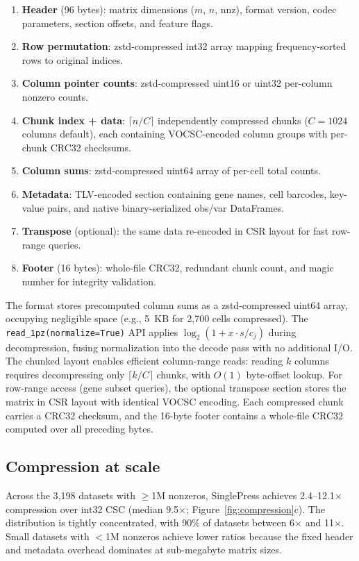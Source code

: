 \documentclass[10pt,twocolumn,letterpaper]{article}
\begin{document}
\begin{enumerate}
\item \textbf{Header} (96 bytes): matrix dimensions ($m$, $n$, nnz), format version, codec parameters, section offsets, and feature flags.
\item \textbf{Row permutation}: zstd-compressed int32 array mapping frequency-sorted rows to original indices.
\item \textbf{Column pointer counts}: zstd-compressed uint16 or uint32 per-column nonzero counts.
\item \textbf{Chunk index + data}: $\lceil n / C \rceil$ independently compressed chunks ($C = 1024$ columns default), each containing VOCSC-encoded column groups with per-chunk CRC32 checksums.
\item \textbf{Column sums}: zstd-compressed uint64 array of per-cell total counts.
\item \textbf{Metadata}: TLV-encoded section containing gene names, cell barcodes, key-value pairs, and native binary-serialized obs/var DataFrames.
\item \textbf{Transpose} (optional): the same data re-encoded in CSR layout for fast row-range queries.
\item \textbf{Footer} (16 bytes): whole-file CRC32, redundant chunk count, and magic number for integrity validation.
\end{enumerate}

The format stores precomputed column sums as a zstd-compressed uint64 array, occupying negligible space (e.g., 5~KB for 2{,}700 cells compressed).
The \texttt{read\_1pz(normalize=True)} API applies $\log_2(1 + x \cdot s / c_j)$ during decompression, fusing normalization into the decode pass with no additional I/O.
The chunked layout enables efficient column-range reads: reading $k$ columns requires decompressing only $\lceil k / C \rceil$ chunks, with $O(1)$ byte-offset lookup.
For row-range access (gene subset queries), the optional transpose section stores the matrix in CSR layout with identical VOCSC encoding.
Each compressed chunk carries a CRC32 checksum, and the 16-byte footer contains a whole-file CRC32 computed over all preceding bytes.

\subsection{Compression at scale}

Across the 3{,}198 datasets with $\geq$1M nonzeros, SinglePress achieves 2.4--12.1$\times$ compression over int32 CSC (median 9.5$\times$; Figure~\ref{fig:compression}c).
The distribution is tightly concentrated, with 90\% of datasets between 6$\times$ and 11$\times$.
Small datasets with $<$1M nonzeros achieve lower ratios because the fixed header and metadata overhead dominates at sub-megabyte matrix sizes.
\end{document}

